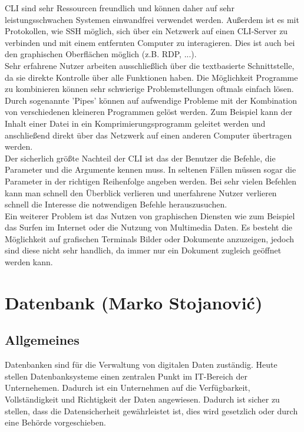 \documentclass[12pt,a4paper]{report}
\begin{document}
\begin{onehalfspace}
CLI sind sehr Ressourcen freundlich und können daher auf sehr leistungsschwachen Systemen einwandfrei verwendet werden. Außerdem ist es mit Protokollen, wie SSH möglich, sich über ein Netzwerk auf einen CLI-Server zu verbinden und mit einem entfernten Computer zu interagieren. Dies ist auch bei den graphischen Oberflächen möglich (z.B. RDP, ...).\\

Sehr erfahrene Nutzer arbeiten ausschließlich über die textbasierte Schnittstelle, da sie direkte Kontrolle über alle Funktionen haben. Die Möglichkeit Programme zu kombinieren können sehr schwierige Problemstellungen oftmals einfach lösen. Durch sogenannte 'Pipes' können auf aufwendige Probleme mit der Kombination von verschiedenen kleineren Programmen gelöst werden. Zum Beispiel kann der Inhalt einer Datei in ein Komprimierungsprogramm geleitet werden und anschließend direkt über das Netzwerk auf einen anderen Computer übertragen werden.\\

Der sicherlich größte Nachteil der CLI ist das der Benutzer die Befehle, die Parameter und die Argumente kennen muss. In seltenen Fällen müssen sogar die Parameter in der richtigen Reihenfolge angeben werden. Bei sehr vielen Befehlen kann man schnell den Überblick verlieren und unerfahrene Nutzer verlieren schnell die Interesse die notwendigen Befehle herauszusuchen.\\

Ein weiterer Problem ist das Nutzen von graphischen Diensten wie zum Beispiel das Surfen im Internet oder die Nutzung von Multimedia Daten. Es besteht die Möglichkeit auf grafischen Terminals Bilder oder Dokumente anzuzeigen, jedoch sind diese nicht sehr handlich, da immer nur ein Dokument zugleich geöffnet werden kann.\\


\chapter{Datenbank (Marko Stojanovi\'{c})}

\section{Allgemeines}
Datenbanken sind für die Verwaltung von digitalen Daten zuständig. Heute stellen Datenbanksysteme einen zentralen Punkt im IT-Bereich der Unternehemen. Dadurch ist ein Unternehmen auf die Verfügbarkeit, Vollständigkeit und Richtigkeit der Daten angewiesen. Dadurch ist sicher zu stellen, dass die Datensicherheit gewährleistet ist, dies wird gesetzlich oder durch eine Behörde vorgeschieben.\\


\end{onehalfspace}
\end{document}

